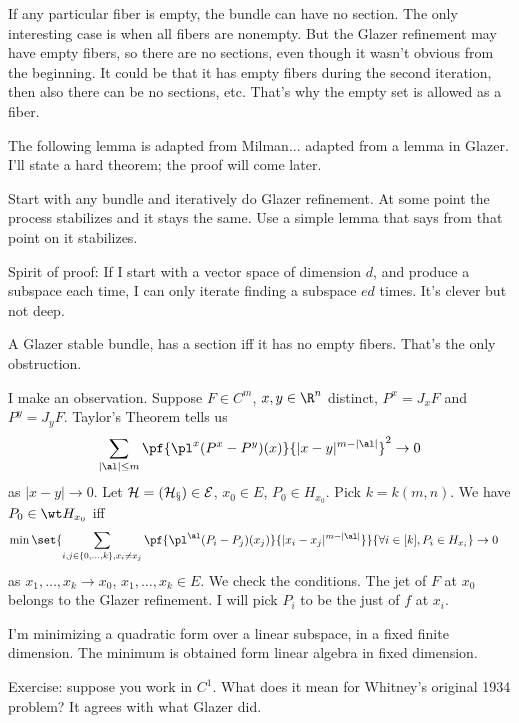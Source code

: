 If any particular fiber is empty, the bundle can have no section. The only interesting case is when all fibers are nonempty. But the Glazer refinement may have empty fibers, so there are no sections, even though it wasn't obvious from the beginning. It could be that it has empty fibers during the second iteration, then also there can be no sections, etc. That's why the empty set is allowed as a fiber.

The following lemma is adapted from Milman... adapted from a lemma in Glazer. I'll state a hard theorem; the proof will come later.

Start with any bundle and iteratively do Glazer refinement. At some point the process stabilizes and it stays the same. 
Use a simple lemma that says from that point on it stabilizes.

Spirit of proof: If I start with a vector space of dimension $d$, and produce a subspace each time, I can only iterate finding a subspace  $ed$ times. It's clever but not deep.

A Glazer stable bundle, has a section iff it has no empty fibers. That's the only obstruction.

I make an observation. Suppose $F\in C^m$, $x,y\in \R^n$ distinct, $P^x = J_xF$ and $P^y = J_yF$. Taylor's Theorem tells us
\begin{align}
\sum_{|\al|\le m}
\pf{\pl^x(P^x-P^y)(x)}{|x-y|^{m-|\al|}}^2
\to 0
\label{eq:taylor-inf}
\end{align}
as $|x-y|\to 0$. Let $\cal H=(H_x)\in E$, $x_0\in E$, $P_0\in H_{x_0}$. Pick $k=k(m,n)$.
We have $P_0\in \wt H_{x_0}$ iff
\begin{align}
\min\set{
\sum_{i,j\in \{0,\ldots, k\}, x_i\ne x_j}
\pf{\pl^\al(P_i-P_j)(x_j)}{|x_i-x_j|^{m-|\al|}}
}{\forall i\in [k], P_i\in H_{x_i} }
&\to 0
\end{align}
as $x_1,\ldots, x_k\to x_0$, $x_1,\ldots, x_k\in E$. We check the conditions. 
The jet of $F$ at $x_0$ belongs to the Glazer refinement. I will pick $P_i$ to be the just of $f$ at $x_i$. %

I'm minimizing a quadratic form over a linear subspace, in a fixed finite dimension. The minimum is obtained form linear algebra in fixed dimension.

Exercise: suppose you work in $C^1$. What does it mean for Whitney's original 1934 problem? It agrees with what Glazer did.

